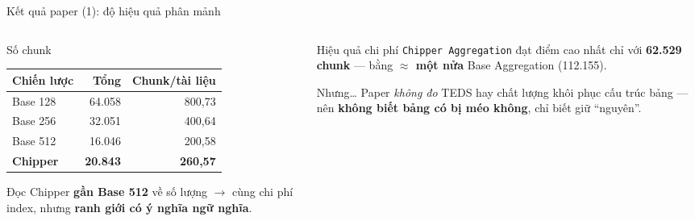 \documentclass[aspectratio=169,11pt]{beamer}
\begin{document}
\begin{frame}{Kết quả paper (1): độ hiệu quả phân mảnh}
  \begin{columns}[T]
    \begin{column}{0.50\textwidth}
      \begin{block}{\small Số chunk}
        \centering\footnotesize
        \begin{tabular}{@{}lrr@{}}
          \toprule
          \textbf{Chiến lược} & \textbf{Tổng} & \textbf{Chunk/tài liệu} \\
          \midrule
          Base 128 & 64.058 & 800,73 \\
          Base 256 & 32.051 & 400,64 \\
          Base 512 & 16.046 & 200,58 \\
          \textbf{Chipper} & \textbf{20.843} & \textbf{260,57} \\
          \bottomrule
        \end{tabular}
      \end{block}
      \begin{block}{\small Đọc}
        Chipper \textbf{gần Base 512} về số lượng $\rightarrow$ cùng chi phí index,
        nhưng \textbf{ranh giới có ý nghĩa ngữ nghĩa}.
      \end{block}
    \end{column}
    \begin{column}{0.48\textwidth}
      \begin{alertblock}{\small Hiệu quả chi phí}
        \texttt{Chipper Aggregation} đạt điểm cao nhất chỉ với
        \textbf{62.529 chunk} — bằng \textbf{$\approx$ một nửa}
        Base Aggregation (112.155).
      \end{alertblock}
      \begin{block}{\small Nhưng\ldots}
        \small Paper \emph{không đo} TEDS hay chất lượng khôi phục cấu trúc bảng —
        nên \textbf{không biết bảng có bị méo không}, chỉ biết giữ ``nguyên''.
      \end{block}
    \end{column}
  \end{columns}
\end{frame}
\end{document}
